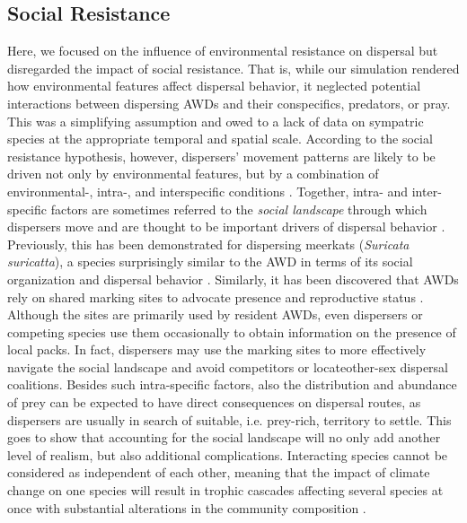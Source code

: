 \documentclass[abstract=on,10pt,a4paper,bibliography=totocnumbered]{article}
\begin{document}
\subsection{Social Resistance}
Here, we focused on the influence of environmental resistance on dispersal but
disregarded the impact of social resistance. That is, while our simulation
rendered how environmental features affect dispersal behavior, it neglected
potential interactions between dispersing AWDs and their conspecifics,
predators, or pray. This was a simplifying assumption and owed to a lack of data
on sympatric species at the appropriate temporal and spatial scale. According to
the social resistance hypothesis, however, dispersers' movement patterns are
likely to be driven not only by environmental features, but by a combination of
environmental-, intra-, and interspecific conditions \citep{Armansin.2019}.
Together, intra- and inter-specific factors are sometimes referred to the
\textit{social landscape} through which dispersers move and are thought to be
important drivers of dispersal behavior \citep{Wey.2015}. Previously, this has
been demonstrated for dispersing meerkats (\textit{Suricata suricatta}), a
species surprisingly similar to the AWD in terms of its social organization and
dispersal behavior \citep{Cozzi.2018}. Similarly, it has been discovered that
AWDs rely on shared marking sites to advocate presence and reproductive status
\citep{Apps.2022, Claase.2022}. Although the sites are primarily used by
resident AWDs, even dispersers or competing species use them occasionally to
obtain information on the presence of local packs. In fact, dispersers may use
the marking sites to more effectively navigate the social landscape and avoid
competitors or locateother-sex dispersal coalitions. Besides such intra-specific
factors, also the distribution and abundance of prey can be expected to have
direct consequences on dispersal routes, as dispersers are usually in search of
suitable, i.e. prey-rich, territory to settle. This goes to show that accounting
for the social landscape will no only add another level of realism, but also
additional complications. Interacting species cannot be considered as
independent of each other, meaning that the impact of climate change on one
species will result in trophic cascades affecting several species at once with
substantial alterations in the community composition \citep{Thuiller.2006}.
\end{document}
